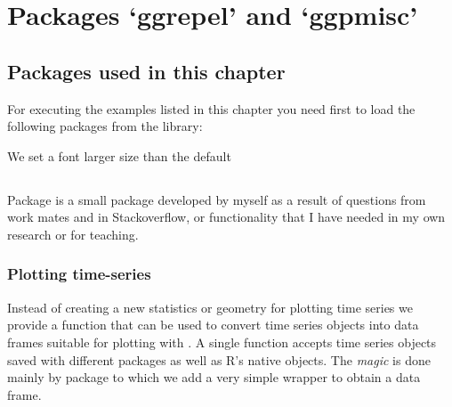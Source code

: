 \documentclass[paper=a4,10pt,div=17,headsepline,BCOR=12mm,twoside,open=right]{scrbook}\usepackage{knitr}
\begin{document}
\chapter[ggrepel and ggpmisc]{Packages `ggrepel' and `ggpmisc'}\label{chap:R:plotting}

\section{Packages used in this chapter}

For executing the examples listed in this chapter you need first to load the following packages from the library:

\begin{knitrout}\footnotesize
{}\color{fgcolor}\begin{kframe}
\begin{alltt}
\end{alltt}
\end{kframe}
\end{knitrout}

We set a font larger size than the default
\begin{knitrout}\footnotesize
{}\color{fgcolor}\begin{kframe}
\begin{alltt}
\hlstd{(}\hlstd{(}\hlstd{))}
\end{alltt}
\end{kframe}
\end{knitrout}




\section[ggpmisc]{\ggpmisc}

Package \ggpmisc is a small package developed by myself as a result of questions from work mates and in Stackoverflow, or functionality that I have needed in my own research or for teaching.

\subsection{Plotting time-series}

Instead of creating a new statistics or geometry for plotting time series we provide a function that can be used to convert time series objects into data frames suitable for plotting with \ggplot. A single function  accepts time series objects saved with different packages as well as R's native  objects. The \textit{magic} is done mainly by package \xts to which we add a very simple wrapper to obtain a data frame.
\end{document}

